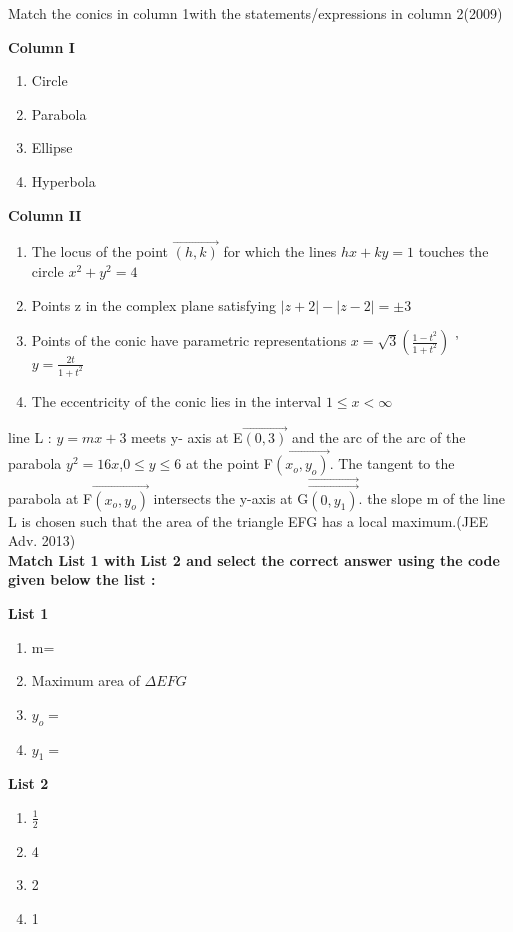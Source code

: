 \item Match the conics in column 1with the statements/expressions in column 2\hfill{(2009)}

\begin{multicols}{2}
\textbf{Column I}
\begin{enumerate}
    \item  Circle
    \item  Parabola
    \item  Ellipse 
    \item  Hyperbola  
\end{enumerate} 
\columnbreak
\textbf{Column II}
\begin{enumerate}
	\item The locus of the point $\vec{(h,k)}$ for which the lines $hx + ky =1$ touches the circle $x^2 + y^2 = 4$
    \item Points z in the complex plane satisfying $|z + 2|- |z - 2|= \pm 3$
    \item Points of the conic have parametric representations $x=\sqrt{3}
(\frac{1 - t^2}{1 + t^2})$ ' $ y = \frac{2t}{1 + t^2}$

    \item The eccentricity of the conic lies in the interval $1 \leq x < \infty$

\end{enumerate}
\end{multicols}

\item line L : $y = mx + 3$ meets y- axis at E$\vec{(0,3)}$ and the arc of the arc of the parabola $y^2 = 16x$,$ 0\leq y \leq6$ at the point F$\vec{(x_o,y_o)}$. The tangent to the parabola at F$\vec{(x_o,y_o)}$ intersects the y-axis at G$\vec\vec{(0,y_1)}$. the slope m of the line L is chosen such that the area of the triangle EFG has a local maximum.\hfill{(JEE Adv. 2013)} \\
\textbf{Match List 1 with List 2 and select the correct answer using the code given below the list :}

\begin{minipage}[t]{0.45\textwidth}
\textbf{List 1}
\begin{enumerate}
    \item m=
    \item Maximum area of $\Delta EFG$
    \item $y_o=$
    \item $y_1=$
\end{enumerate}
\end{minipage}%
\hfill
\begin{minipage}[t]{0.45\textwidth}
\textbf{List 2}
\begin{enumerate}
    \item $\frac{1}{2}$
    \item 4
    \item 2
    \item 1
\end{enumerate}
\end{minipage} 


